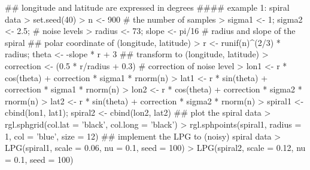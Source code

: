 \begin{example}
   ## longitude and latitude are expressed in degrees
   #### example 1: spiral data 
   > set.seed(40)
   > n <- 900                                     # the number of samples
   > sigma1 <- 1; sigma2 <- 2.5;                  # noise levels
   > radius <- 73; slope <- pi/16                 # radius and slope of the spiral
   ## polar coordinate of (longitude, latitude)
   > r <- runif(n)^(2/3) * radius; theta <- -slope * r + 3 
   ## transform to (longitude, latitude)
   > correction <- (0.5 * r/radius + 0.3)         # correction of noise level
   > lon1 <- r * cos(theta) + correction * sigma1 * rnorm(n)
   > lat1 <- r * sin(theta) + correction * sigma1 * rnorm(n)
   > lon2 <- r * cos(theta) + correction * sigma2 * rnorm(n)
   > lat2 <- r * sin(theta) + correction * sigma2 * rnorm(n)
   > spiral1 <- cbind(lon1, lat1); spiral2 <- cbind(lon2, lat2)
   ## plot the spiral data
   > rgl.sphgrid(col.lat = 'black', col.long = 'black')
   > rgl.sphpoints(spiral1, radius = 1, col = 'blue', size = 12)
   ## implement the LPG to (noisy) spiral data
   > LPG(spiral1, scale = 0.06, nu = 0.1, seed = 100)
   > LPG(spiral2, scale = 0.12, nu = 0.1, seed = 100)
\end{example}

